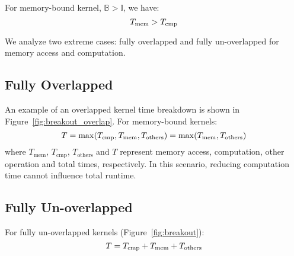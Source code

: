 For memory-bound kernel, $\mathbb{B}>\mathbb{I}$, we have:
\begin{equation}\footnotesize
T_{\text{mem}} > T_{\text{cmp}}
\end{equation}

We analyze two extreme cases: fully overlapped and fully un-overlapped for memory access and computation.

\subsection{Fully Overlapped}\label{sec:anaovl}

An example of an overlapped kernel time breakdown is shown in Figure~\ref{fig:breakout_overlap}. For memory-bound kernels:
\begin{equation}\footnotesize
T = \max(T_{\text{cmp}},T_{\text{mem}},T_{\text{others}})=\max(T_{\text{mem}},T_{\text{others}})
\end{equation}
where $T_{\text{mem}}$, $T_{\text{cmp}}$, $T_{\text{others}}$ and $T$ represent memory access, computation, other operation and total times, respectively. In this scenario, reducing computation time cannot influence total runtime.




\subsection{Fully Un-overlapped}\label{sec:anaunovl}


For fully un-overlapped kernels (Figure~\ref{fig:breakout}):
\begin{equation}\footnotesize
T = T_{\text{cmp}}+T_{\text{mem}}+T_{\text{others}}
\end{equation}

